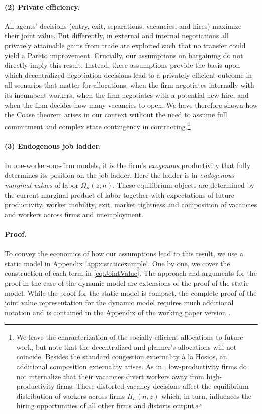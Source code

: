 \paragraph{(2) Private efficiency.}
All agents’ decisions (entry, exit, separations, vacancies, and hires) maximize their joint value.
Put differently, in external and internal negotiations all privately attainable gains from trade are exploited such that no transfer could yield a Pareto improvement.
Crucially, our assumptions on bargaining do not directly imply this result.
Instead, these assumptions provide the basis upon which decentralized negotiation decisions lead to a privately efficient outcome in all scenarios that matter for allocations: when the firm negotiates internally with its incumbent workers, when the firm negotiates with a potential new hire, and when the firm decides how many vacancies to open.
We have therefore shown how the Coase theorem arises in our context without the need to assume full commitment and complex state contingency in contracting.\footnote{
    We leave the characterization of the socially efficient allocations to future work, but note that the decentralized and planner's allocations will not coincide.
    Besides the standard congestion externality \`a la Hosios, an additional composition externality arises.
    As in \citet{acemoglu2001good}, low-productivity firms do not internalize that their vacancies divert workers away from high-productivity firms.
    These distorted vacancy decisions affect the equilibrium distribution of workers across firms $H_n(n,z)$ which, in turn, influences the hiring opportunities of all other firms and distorts output.}

\vspace*{-.3cm}
\paragraph{(3) Endogenous job ladder.}
In one-worker-one-firm models, it is the firm's \textit{exogenous} productivity that fully determines its position on the job ladder.
Here the ladder is in \emph{endogenous marginal values} of labor $\Omega_n(z,n)$.
These equilibrium objects are determined by the current marginal product of labor together with expectations of future productivity, worker mobility, exit, market tightness and composition of vacancies and workers across firms and unemployment.

\paragraph{Proof.}
To convey the economics of how our assumptions lead to this result, we use a static model in Appendix \ref{appx:staticexample}.
One by one, we cover the construction of each term in \eqref{eq:JointValue}.
The approach and arguments for the proof in the case of the dynamic model are extensions of the proof of the static model.
While the proof for the static model is compact, the complete proof of the joint value representation for the dynamic model requires much additional notation and is contained in the Appendix of the working paper version \citep{BEMVworkingpaper}.

